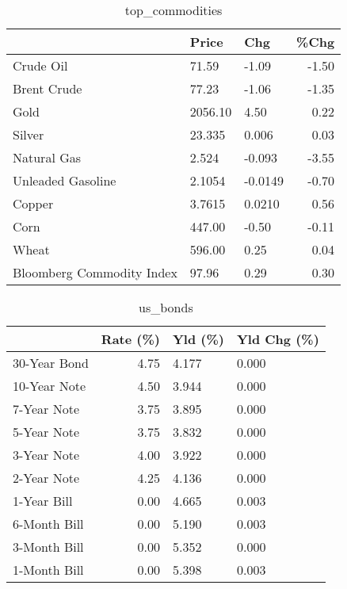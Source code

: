 \documentclass{article}%
\begin{document}
\begin{table}[htbp]%
\caption{top\_commodities}%
\centering%
\begin{adjustbox}{width=1\textwidth}%
\begin{tabular}{lllr}
\toprule
                          &   Price &     Chg &  \%Chg \\
\midrule
               Crude Oil  &   71.59 &   -1.09 & -1.50 \\
             Brent Crude  &   77.23 &   -1.06 & -1.35 \\
                    Gold  & 2056.10 &    4.50 &  0.22 \\
                  Silver  &  23.335 &   0.006 &  0.03 \\
             Natural Gas  &   2.524 &  -0.093 & -3.55 \\
       Unleaded Gasoline  &  2.1054 & -0.0149 & -0.70 \\
                  Copper  &  3.7615 &  0.0210 &  0.56 \\
                    Corn  &  447.00 &   -0.50 & -0.11 \\
                   Wheat  &  596.00 &    0.25 &  0.04 \\
Bloomberg Commodity Index &   97.96 &    0.29 &  0.30 \\
\bottomrule
\end{tabular}
%
\end{adjustbox}%
\end{table}

%


\begin{table}[htbp]%
\caption{us\_bonds}%
\centering%
\begin{adjustbox}{width=1\textwidth}%
\begin{tabular}{lrll}
\toprule
             &  Rate (\%) & Yld (\%) & Yld Chg (\%) \\
\midrule
30-Year Bond &      4.75 &   4.177 &       0.000 \\
10-Year Note &      4.50 &   3.944 &       0.000 \\
 7-Year Note &      3.75 &   3.895 &       0.000 \\
 5-Year Note &      3.75 &   3.832 &       0.000 \\
 3-Year Note &      4.00 &   3.922 &       0.000 \\
 2-Year Note &      4.25 &   4.136 &       0.000 \\
 1-Year Bill &      0.00 &   4.665 &       0.003 \\
6-Month Bill &      0.00 &   5.190 &       0.003 \\
3-Month Bill &      0.00 &   5.352 &       0.000 \\
1-Month Bill &      0.00 &   5.398 &       0.003 \\
\bottomrule
\end{tabular}
%
\end{adjustbox}%
\end{table}
\end{document}
